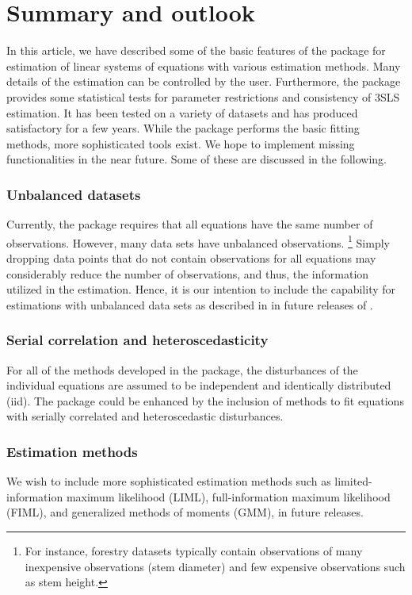

\section{Summary and outlook}\label{sec:Summmary}
\nopagebreak
In this article, we have described some of the basic features of the
 package for estimation of linear systems of
equations with various estimation methods.
Many details of the estimation can be controlled by the user.
Furthermore, the package provides some statistical tests
for parameter restrictions and consistency of 3SLS estimation.
It has been tested on a variety of datasets and has produced satisfactory
for a few years.
While the  package performs the basic fitting methods,
more sophisticated tools exist.
We hope to implement missing functionalities
in the near future.
Some of these are discussed in the following.

\subsubsection*{Unbalanced datasets}
Currently, the  package requires
that all equations have the same number of observations.
However, many data sets have unbalanced observations.%
\footnote{
For instance,
forestry datasets typically contain observations of many inexpensive
observations (stem diameter) and few expensive observations such
as stem height.
}
Simply dropping data points
that do not contain observations for all equations
may considerably reduce the number of observations,
and thus, the information utilized in the estimation.
Hence, it is our intention to include the capability for estimations
with unbalanced data sets as described in \citet{schmidt77}
in future releases of .

\subsubsection*{Serial correlation and heteroscedasticity}
For all of the methods developed in the package, the disturbances of
the individual equations are assumed to be independent and identically
distributed (iid).
The package could be enhanced by the inclusion of methods to fit
equations with serially correlated and heteroscedastic disturbances.

\subsubsection*{Estimation methods}
We wish to include more sophisticated estimation methods such
as limited-information maximum likelihood (LIML),
full-information maximum likelihood (FIML),
and generalized methods of moments (GMM), in future releases.

